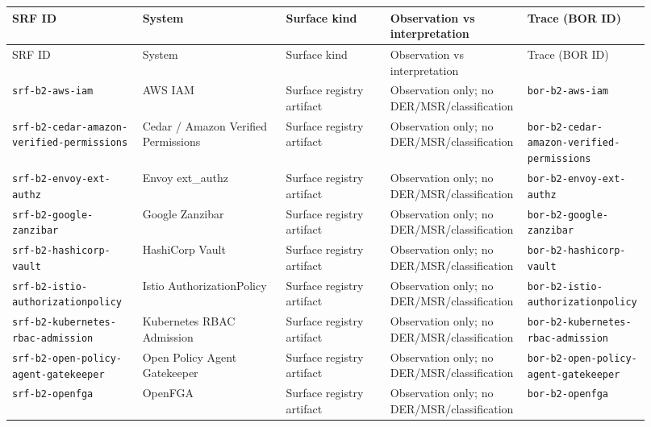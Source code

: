\begin{center}
\begin{longtable}{@{}p{0.20\linewidth}p{0.22\linewidth}p{0.16\linewidth}p{0.20\linewidth}p{0.14\linewidth}@{}}
\toprule
SRF ID & System & Surface kind & Observation vs interpretation & Trace (BOR ID) \\
\midrule
\endfirsthead
\toprule
SRF ID & System & Surface kind & Observation vs interpretation & Trace (BOR ID) \\
\midrule
\endhead
\bottomrule
\endfoot
\bottomrule
\endlastfoot
\texttt{srf-b2-aws-iam} & AWS IAM & Surface registry artifact & Observation only; no DER/MSR/classification & \texttt{bor-b2-aws-iam} \\
\texttt{srf-b2-cedar-amazon-verified-permissions} & Cedar / Amazon Verified Permissions & Surface registry artifact & Observation only; no DER/MSR/classification & \texttt{bor-b2-cedar-amazon-verified-permissions} \\
\texttt{srf-b2-envoy-ext-authz} & Envoy ext\_authz & Surface registry artifact & Observation only; no DER/MSR/classification & \texttt{bor-b2-envoy-ext-authz} \\
\texttt{srf-b2-google-zanzibar} & Google Zanzibar & Surface registry artifact & Observation only; no DER/MSR/classification & \texttt{bor-b2-google-zanzibar} \\
\texttt{srf-b2-hashicorp-vault} & HashiCorp Vault & Surface registry artifact & Observation only; no DER/MSR/classification & \texttt{bor-b2-hashicorp-vault} \\
\texttt{srf-b2-istio-authorizationpolicy} & Istio AuthorizationPolicy & Surface registry artifact & Observation only; no DER/MSR/classification & \texttt{bor-b2-istio-authorizationpolicy} \\
\texttt{srf-b2-kubernetes-rbac-admission} & Kubernetes RBAC Admission & Surface registry artifact & Observation only; no DER/MSR/classification & \texttt{bor-b2-kubernetes-rbac-admission} \\
\texttt{srf-b2-open-policy-agent-gatekeeper} & Open Policy Agent Gatekeeper & Surface registry artifact & Observation only; no DER/MSR/classification & \texttt{bor-b2-open-policy-agent-gatekeeper} \\
\texttt{srf-b2-openfga} & OpenFGA & Surface registry artifact & Observation only; no DER/MSR/classification & \texttt{bor-b2-openfga} \\
\end{longtable}
\end{center}


